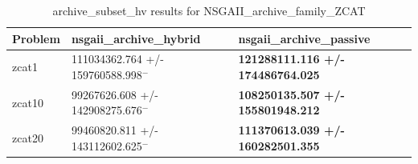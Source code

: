 \begin{table}
\caption{archive_subset_hv results for NSGAII_archive_family_ZCAT}
\label{NSGAII_archive_family_ZCAT_archive_subset_hv}
\begin{tabular}{lll}
\toprule
Problem & nsgaii_archive_hybrid & nsgaii_archive_passive \\
\midrule
zcat1 & 111034362.764 +/- 159760588.998$^{-}$ & \textbf{121288111.116 +/- 174486764.025} \\
zcat10 & 99267626.608 +/- 142908275.676$^{-}$ & \textbf{108250135.507 +/- 155801948.212} \\
zcat20 & 99460820.811 +/- 143112602.625$^{-}$ & \textbf{111370613.039 +/- 160282501.355} \\
\bottomrule
\end{tabular}
\end{table}
